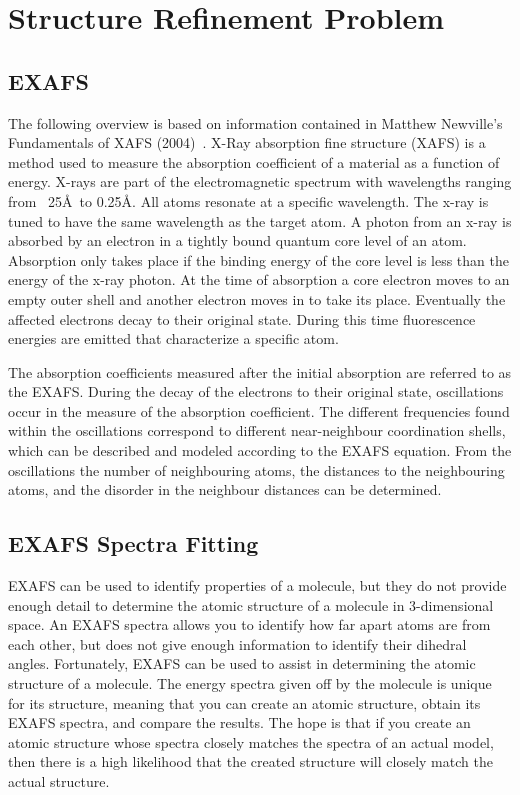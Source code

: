 \documentclass[conference]{IEEEtran}
\begin{document}
\section{Structure Refinement Problem}
\label{sec:refinementProblem}

\subsection{EXAFS}

The following overview is based on information contained in Matthew Newville’s Fundamentals of XAFS (2004)~\cite{Newville2004Fundamentals}. X-Ray absorption fine structure (XAFS) is a method used to measure the absorption coefficient of a material as a function of energy. X-rays are part of the electromagnetic spectrum with wavelengths ranging from ~25\AA\ to 0.25\AA. All atoms resonate at a specific wavelength. The x-ray is tuned to have the same wavelength as the target atom. A photon from an x-ray is absorbed by an electron in a tightly bound quantum core level of an atom. Absorption only takes place if the binding energy of the core level is less than the energy of the x-ray photon. At the time of absorption a core electron moves to an empty outer shell and another electron moves in to take its place. Eventually the affected electrons decay to their original state. During this time fluorescence energies are emitted that characterize a specific atom.

The absorption coefficients measured after the initial absorption are referred to as the EXAFS. During the decay of the electrons to their original state, oscillations occur in the measure of the absorption coefficient. The different frequencies found within the oscillations correspond to different near-neighbour coordination shells, which can be described and modeled according to the EXAFS equation. From the oscillations the number of neighbouring atoms, the distances to the neighbouring atoms, and the disorder in the neighbour distances can be determined.

\subsection{EXAFS Spectra Fitting}

EXAFS can be used to identify properties of a molecule, but they do not provide enough detail to determine the atomic structure of a molecule in 3-dimensional space. An EXAFS spectra allows you to identify how far apart atoms are from each other, but does not give enough information to identify their dihedral angles. Fortunately, EXAFS can be used to assist in determining the atomic structure of a molecule. The energy spectra given off by the molecule is unique for its structure, meaning that you can create an atomic structure, obtain its EXAFS spectra, and compare the results. The hope is that if you create an atomic structure whose spectra closely matches the spectra of an actual model, then there is a high likelihood that the created structure will closely match the actual structure.
\end{document}

